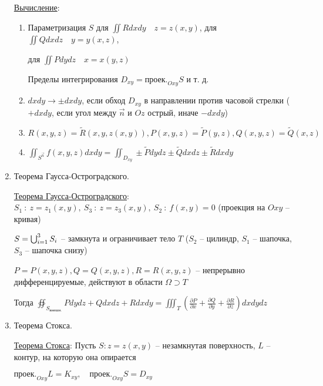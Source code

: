 \documentclass[12pt]{article}
\begin{document}
\begin{enumerate}
        \hyperlink{surfaceintegralofsecondkindcalculation}{Вычисление}:

        \begin{enumerate}
            \item Параметризация $S$ \quad для $\iint Rdxdy \quad z = z(x, y)$, для $\iint Qdxdz \quad y = y(x, z)$,

            для $\iint Pdydz \quad x = x(y, z)$

            Пределы интегрирования $D_{xy} = \text{проек.}_{Oxy} S$ и т. д.

            \item $dxdy \to \pm dxdy$, если обход $D_{xy}$ в направлении против часовой стрелки ($+dxdy$, если угол между $\vec{n}$ и $Oz$ острый, иначе $-dxdy$)

            \item $R(x, y, z) = \tilde{R}(x, y, z(x, y)), P(x, y, z) = \tilde{P}(y, z), Q(x, y, z) = \tilde{Q}(x, z)$

            \item $\iint_{S^{\vec{n}}} f(x, y, z) dxdy = \iint_{D_{xy}} \pm \tilde{P}dydz \pm \tilde{Q}dxdz \pm \tilde{R}dxdy$
        \end{enumerate}

        \item Теорема Гаусса-Остроградского.

        \hyperlink{theoremGaussOstrogradskyy}{Теорема Гаусса-Остроградского}:
        $S_1\ : \ z = z_1(x, y),\ S_3\ :\ z = z_3(x, y),\ S_2\ : \ f(x, y) = 0$ (проекция на $Oxy$ -- кривая)

        $S = \bigcup_{i = 1}^3 S_i$ -- замкнута и ограничивает тело $T$ ($S_2$ -- цилиндр, $S_1$ -- шапочка, $S_3$ -- шапочка снизу)

        $P = P(x, y, z), Q = Q(x, y, z), R = R(x, y, z)$ -- непрерывно дифференцируемые, действуют в области $\Omega \supset T$

        Тогда $\oiint_{S_{\text{внешн.}}} Pdydz + Qdxdz + Rdxdy = \iiint_T \left(\frac{\partial P}{\partial x} + \frac{\partial Q}{\partial y} + \frac{\partial R}{\partial z}\right) dxdydz$


        \item Теорема Стокса.

        \hyperlink{theoremStokes}{Теорема Стокса}: Пусть $S : z = z(x, y)$ -- незамкнутая поверхность, $L$ -- контур, на которую она опирается

        $\text{проек.}_{Oxy} L = K_{xy}, \quad \text{проек.}_{Oxy} S = D_{xy}$


\end{enumerate}
\end{document}
